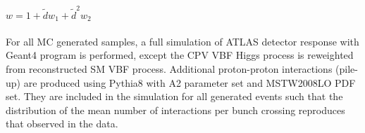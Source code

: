 \begin{center}
\begin{math}
w = 1+\tilde{d}w_1 + \tilde{d}^2w_2
\end{math}
\end{center}

\paragraph{} For all MC generated samples, a full simulation of ATLAS detector response with Geant4 program is performed, except the CPV VBF Higgs process is reweighted from reconstructed SM VBF process. Additional proton-proton interactions (pile-up) are produced using Pythia8 with A2 parameter set and MSTW2008LO PDF set. They are included in the simulation for all generated events such that the distribution of the mean number of interactions per bunch crossing reproduces that observed in the data.

